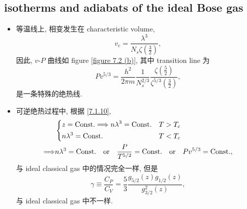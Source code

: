 \subsection{isotherms and adiabats of the ideal Bose gas}
\begin{itemize}
	\item 等温线上, 相变发生在 characteristic volume,
	\begin{equation}
		v_c = \frac{\lambda^3}{N_s \zeta(\frac{3}{2})},
	\end{equation}
	因此, $v$-$P$ 曲线如 figure \ref{figure 7.2 (b)}, 其中 transition line 为
	\begin{equation}
		P v^{5 / 3} = \frac{h^2}{2 \pi m} \frac{1}{N_s^{2 / 3}} \frac{\zeta(\frac{5}{2})}{\zeta^{5 / 3}(\frac{3}{2})},
	\end{equation}
	是一条特殊的绝热线.
	
	\item 可逆绝热过程中, 根据 \eqref{7.1.10},
	\begin{align}
		& \begin{dcases}
			z = \text{Const.} \Longrightarrow n \lambda^3 = \text{Const.} & T > T_c \\
			n \lambda^3 = \text{Const.} & T < T_c
		\end{dcases} \notag \\
		\Longrightarrow & n \lambda^3 = \text{Const.} \quad \text{or} \quad \frac{P}{T^{5 / 2}} = \text{Const.} \quad \text{or} \quad P v^{5 / 3} = \text{Const.},
	\end{align}
	与 ideal classical gas 中的情况完全一样, 但是
	\begin{equation}
		\gamma \equiv \frac{C_P}{C_V} = \frac{5}{3} \frac{g_{5 / 2}(z) g_{1 / 2}(z)}{g_{3 / 2}^2(z)},
	\end{equation}
	与 ideal classical gas 中不一样.
\end{itemize}

